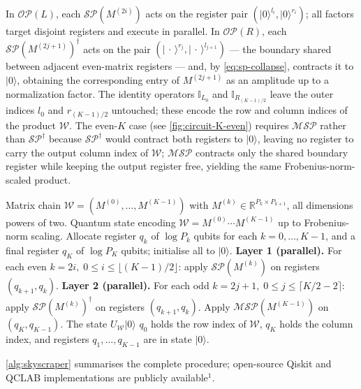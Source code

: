 \documentclass[a4paper,UKenglish,cleveref,autoref,thm-restate]{socg-lipics-v2021}
\providecommand{\ket}[1]{\lvert #1 \rangle}
\newcommand{\SP}{\mathcal{SP}}        %
\newcommand{\MSP}{\mathcal{MSP}} %
\newcommand{\OP}{\mathcal{OP}}        %
\newcommand{\Id}{\mathbb{I}}         %
\begin{document}
In $\OP(L)$, each $\SP(M^{(2i)})$ acts on the register pair $(\ket{0}^{l_i},\ket{0}^{r_i})$; all factors target disjoint registers and execute in parallel. In $\OP(R)$, each $\SP(M^{(2j+1)})^\dagger$ acts on the pair $(\ket{\,\cdot\,}^{r_j},\ket{\,\cdot\,}^{l_{j+1}})$ --- the boundary shared between adjacent even-matrix registers --- and, by \cref{eq:sp-collapse}, contracts it to $\ket{0}$, obtaining the corresponding entry of $M^{(2j+1)}$ as an amplitude up to a normalization factor. The identity operators $\Id_{L_0}$ and $\Id_{R_{(K-1)/2}}$ leave the outer indices $l_0$ and $r_{(K-1)/2}$ untouched; these encode the row and column indices of the product $\mathcal{W}$. The even-$K$ case (see \cref{fig:circuit-K-even}) requires $\MSP$ rather than $\SP^\dagger$ because $\SP^\dagger$ would contract both registers to $\ket{0}$, leaving no register to carry the output column index of $\mathcal{W}$; $\MSP$ contracts only the shared boundary register while keeping the output register free, yielding the same Frobenius-norm-scaled product.

\begin{algorithm}[t]
\caption{Two-Tower Matrix Multiplication}\label{alg:skyscraper}
\begin{algorithmic}[1]
  \Require Matrix chain $\mathcal{W} = (M^{(0)},\ldots,M^{(K-1)})$
           with $M^{(k)} \in \mathbb{R}^{P_k \times P_{k+1}}$, all dimensions powers of two.
  \Ensure Quantum state encoding $\mathcal{W} = M^{(0)}\cdots M^{(K-1)}$
          up to Frobenius-norm scaling.
  \State Allocate register $q_k$ of $\log P_k$ qubits for each
         $k = 0,\ldots,K-1$, and a final register $q_K$ of
         $\log P_K$ qubits; initialise all to $\ket{0}$.
    \State \textbf{Layer 1 (parallel).} For each even $k=2i,\;  0 \leq i \leq \lfloor(K-1)/2\rfloor$:
         apply $\SP(M^{(k)})$ on registers $(q_{k+1}, q_k)$.
    \State \textbf{Layer 2 (parallel).} For each odd $k=2j+1,\;  0 \leq j \leq\lceil K/2 -2\rceil$:
         apply $\SP(M^{(k)})^\dagger$ on registers $(q_{k+1}, q_k)$.
    \State Apply $\MSP(M^{(K-1)})$ on $(q_K, q_{K-1})$.
  \EndIf
  \State \Return The state $U_\mathcal{W}\ket{0} 
        $
        $q_0$ holds the row index of $\mathcal{W}$, $q_K$ holds the column index,
         and registers $q_1,\ldots,q_{K-1}$ are in state $\ket{0}$.
\end{algorithmic}
\end{algorithm}
\cref{alg:skyscraper} summarises the complete procedure; open-source Qiskit and QCLAB implementations are publicly available$^1$. 
\end{document}
